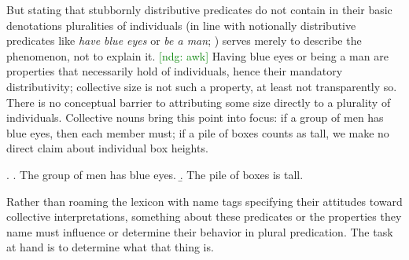 \documentclass[linguex]{sp}
\newcommand{\ndg}[1]{\textcolor{Green}{[ndg: #1]}}
\begin{document}
%
%

But stating that stubbornly distributive predicates do not contain in their basic denotations pluralities of individuals (in line with notionally distributive predicates like \emph{have blue eyes} or \emph{be a man}; \citealp{link1983}) serves merely to describe the phenomenon, not to explain it. \ndg{awk}
Having blue eyes or being a man are properties that necessarily hold of individuals, hence their mandatory distributivity; collective size is not such a property, at least not transparently so. There is no conceptual barrier to attributing some size directly to a plurality of individuals. Collective nouns bring this point into focus: if a group of men has blue eyes, then each member must; if a pile of boxes counts as tall, we make no direct claim about individual box heights.

\ex. \a. The group of men has blue eyes. 
\b. The pile of boxes is tall.

Rather than roaming the lexicon with name tags specifying their attitudes toward collective interpretations, something about these predicates or the properties they name must influence or determine their behavior in plural predication. The task at hand is to determine what that thing is. 



\end{document}

